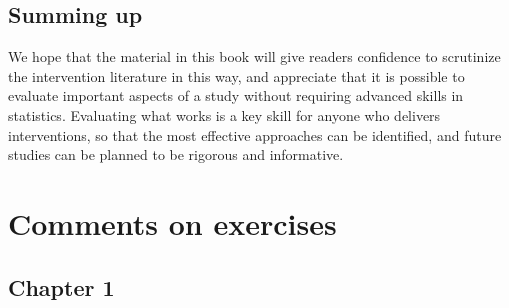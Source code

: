 \documentclass{krantz}
\begin{document}
\hypertarget{summing-up}{%
\section{Summing up}\label{summing-up}}

We hope that the material in this book will give readers confidence to scrutinize the intervention literature in this way, and appreciate that it is possible to evaluate important aspects of a study without requiring advanced skills in statistics. Evaluating what works is a key skill for anyone who delivers interventions, so that the most effective approaches can be identified, and future studies can be planned to be rigorous and informative.

\hypertarget{comments}{%
\chapter{Comments on exercises}\label{comments}}


\hypertarget{chapter-1}{%
\section{Chapter 1}\label{chapter-1}}
\end{document}
